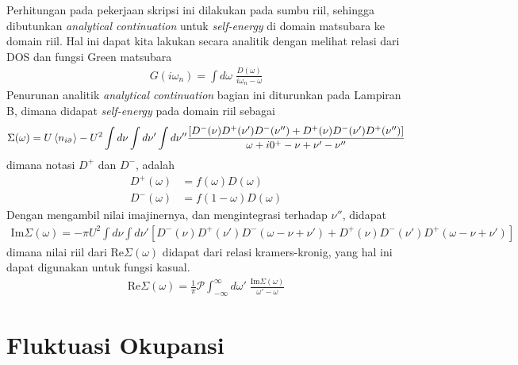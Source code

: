 Perhitungan pada pekerjaan skripsi ini dilakukan pada sumbu riil, sehingga dibutunkan \textit{analytical continuation} untuk \textit{self-energy} di domain matsubara ke domain riil. Hal ini dapat kita lakukan secara analitik dengan melihat relasi dari DOS dan fungsi Green matsubara
\begin{align}
G(i\omega_n) = \int d\omega \; \frac{D(\omega)}{i\omega_n - \omega}
\end{align}
Penurunan analitik \textit{analytical continuation} bagian ini diturunkan pada Lampiran B, dimana didapat \textit{self-energy} pada domain riil sebagai
\begin{align}
\Sigma(\omega) = U\left< n_{i\bar{\sigma}} \right> - U^2 \int d\nu \int d\nu' \int d\nu'' \frac{[D^-(\nu)D^+(\nu')D^-(\nu'') + D^+(\nu)D^-(\nu')D^+(\nu'')]}{\omega + i0^+ - \nu + \nu' - \nu''}\notag
\end{align}
dimana notasi $D^+$ dan $D^-$, adalah
\begin{align}
D^+(\omega) &= f(\omega)D(\omega)\\
D^-(\omega) &= f(1 - \omega)D(\omega)
\end{align}
Dengan mengambil nilai imajinernya, dan mengintegrasi terhadap $\nu''$, didapat
\begin{align}
\text{Im}\Sigma(\omega) = -\pi U^2 \int d\nu \int d\nu' [D^-(\nu)D^+(\nu')D^-(\omega - \nu + \nu') + D^+(\nu)D^-(\nu')D^+(\omega - \nu + \nu')]
\end{align}
dimana nilai riil dari $\text{Re}\Sigma(\omega)$ didapat dari relasi kramers-kronig, yang hal ini dapat digunakan untuk fungsi kasual.
\begin{align}
\text{Re}\Sigma(\omega) = \frac{1}{\pi}\mathcal{P}\int_{-\infty}^\infty d\omega' \;\frac{\text{Im}\Sigma(\omega)}{\omega' - \omega}
\end{align}

\section{Fluktuasi Okupansi}

